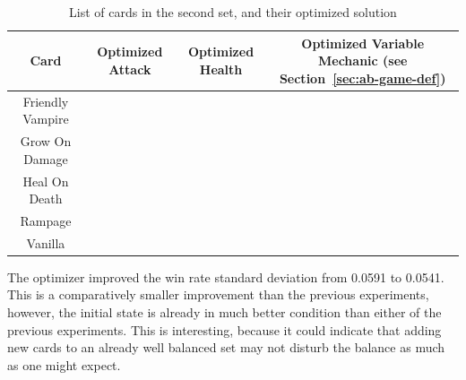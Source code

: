 \begin{table}[t]
\centering
\begin{tabular}{||c c c c||} 
 \hline
 Card & Optimized Attack & Optimized Health & Optimized Variable Mechanic (see Section~\ref{sec:ab-game-def})\\ [0.5ex]
 \hline
 Friendly Vampire &  &  &  \\
 \hline
 Grow On Damage &  &  &  \\
 \hline
 Heal On Death &  &  & \\
 \hline
 Rampage &  &  &  \\ 
 \hline
 Vanilla &  &  &  \\
 \hline
\end{tabular}
\caption{List of cards in the second set, and their optimized solution}
\label{tab:second_set}
\end{table}

The optimizer improved the win rate standard deviation from 0.0591 to 0.0541. This is a comparatively smaller improvement than the previous experiments, however, the initial state is already in much better condition than either of the previous experiments. This is interesting, because it could indicate that adding new cards to an already well balanced set may not disturb the balance as much as one might expect. 


